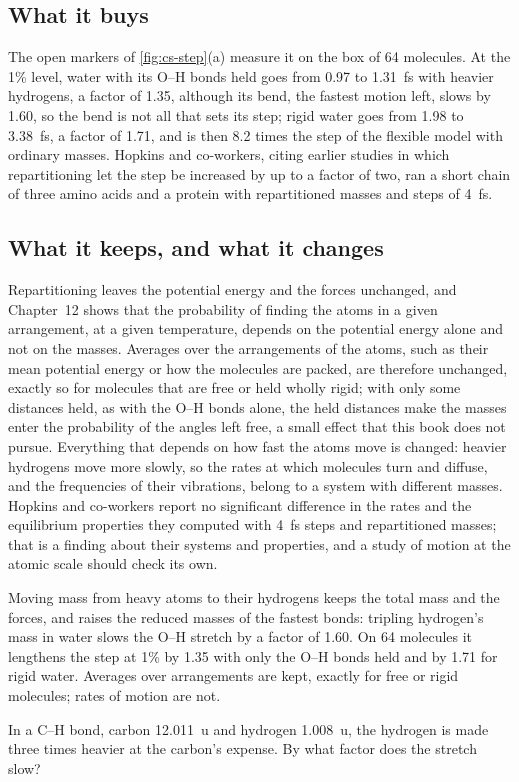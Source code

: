 \subsection*{What it buys}

The open markers of \cref{fig:cs-step}(a) measure it on the box of 64
molecules. At the 1\% level, water with its O--H bonds held goes from
0.97 to \SI{1.31}{\femto\second} with heavier hydrogens, a factor of
1.35, although its bend, the fastest motion left, slows by 1.60, so the
bend is not all that sets its step; rigid water goes from 1.98 to
\SI{3.38}{\femto\second}, a factor of 1.71, and is then 8.2 times the
step of the flexible model with ordinary masses. Hopkins and co-workers,
citing earlier studies in which repartitioning let the step be increased
by up to a factor of two, ran a short chain of three amino acids and a
protein with repartitioned masses and steps of
\SI{4}{\femto\second}\cite{Hopkins2015}.

\subsection*{What it keeps, and what it changes}

Repartitioning leaves the potential energy and the forces unchanged, and
Chapter~12 shows that the probability of finding the atoms in a given
arrangement, at a given temperature, depends on the potential energy
alone and not on the masses. Averages over the arrangements of the atoms,
such as their mean potential energy or how the molecules are packed, are
therefore unchanged, exactly so for molecules that are free or held wholly
rigid; with only some distances held, as with the O--H bonds alone, the
held distances make the masses enter the probability of the angles left
free, a small effect that this book does not pursue. Everything that depends on how fast the atoms move is
changed: heavier hydrogens move more slowly, so the rates at which
molecules turn and diffuse, and the frequencies of their vibrations,
belong to a system with different masses. Hopkins and co-workers report no
significant difference in the rates and the equilibrium properties they
computed with \SI{4}{\femto\second} steps and repartitioned
masses\cite{Hopkins2015};
that is a finding about their systems and properties, and a study of
motion at the atomic scale should check its own.

\begin{keyidea}
Moving mass from heavy atoms to their hydrogens keeps the total mass and
the forces, and raises the reduced masses of the fastest bonds: tripling
hydrogen's mass in water slows the O--H stretch by a factor of 1.60. On
64 molecules it lengthens the step at 1\% by 1.35 with only the O--H bonds
held and by 1.71 for rigid water. Averages over arrangements are kept,
exactly for free or rigid molecules; rates of motion are not.
\end{keyidea}


\begin{selfcheck}
In a C--H bond, carbon \SI{12.011}{\amu} and hydrogen \SI{1.008}{\amu}, the
hydrogen is made three times heavier at the carbon's expense. By what
factor does the stretch slow?
\end{selfcheck}
